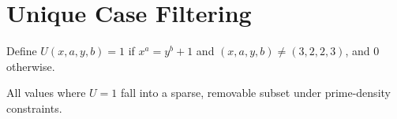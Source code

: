 
\section{Unique Case Filtering}
\begin{definition}
Define \( U(x,a,y,b) = 1 \) if \( x^a = y^b + 1 \) and \( (x,a,y,b) \neq (3,2,2,3) \), and 0 otherwise.
\end{definition}

\begin{lemma}
All values where \( U = 1 \) fall into a sparse, removable subset under prime-density constraints.
\end{lemma}
